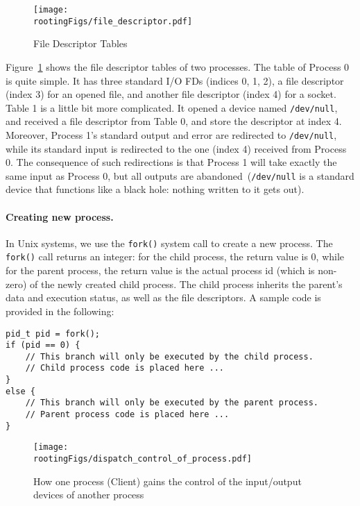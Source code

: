 \begin{figure}[htb]
  \begin{center}
    \texttt{[image: \\rootingFigs/file\_descriptor.pdf]}
  \end{center}
  \caption{File Descriptor Tables}
  \label{fig:rooting:FDTables}
\end{figure}
 

Figure~\ref{fig:rooting:FDTables} shows the file descriptor tables of two processes.
The table of Process 0 is quite simple. It has three
standard I/O FDs (indices 0, 1, 2), a file descriptor (index 3) for an opened file, and 
another file descriptor (index 4) for a socket.
Table 1 is a little bit more complicated. It opened a device named \texttt{/dev/null}, and received a 
file descriptor from Table 0, and store the descriptor at index 4. 
Moreover, Process 1's standard output and error are redirected to \texttt{/dev/null}, while its
standard input is redirected to the one (index 4) received from Process 0. 
The consequence of such redirections is that Process 1 will take exactly the same input 
as Process 0, but all outputs are abandoned~(\texttt{/dev/null} is a standard device that
functions like a black hole: nothing written to it gets out).  


\paragraph{Creating new process.}
In Unix systems, we use the \texttt{fork()} system call to create a new process. 
The \texttt{fork()} call returns an integer: for the child
process, the return value is 0, while for the parent process, the return value
is the actual process id (which is non-zero) of the newly created child process. 
The child process inherits the  parent’s data and execution status, as well as the
file descriptors. A sample code is provided in the following:

\begin{lstlisting}[frame=single, caption={}, label=label]
pid_t pid = fork();
if (pid == 0) {
    // This branch will only be executed by the child process.
    // Child process code is placed here ...
}
else {
    // This branch will only be executed by the parent process.
    // Parent process code is placed here ...
}
\end{lstlisting}
 


\begin{figure}[htb]
  \begin{center}
    \texttt{[image: \\rootingFigs/dispatch\_control\_of\_process.pdf]}
  \end{center}
  \caption{How one process (Client) gains the control of the
       input/output devices of another process}
  \label{fig:rooting:dispatchingControl}
\end{figure}
 



